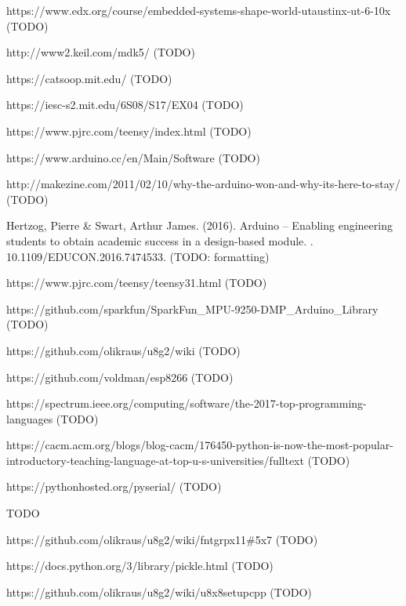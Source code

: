 \documentclass[12pt]{article}
\begin{document}
\newpage
\begin{thebibliography}{}
https://www.edx.org/course/embedded-systems-shape-world-utaustinx-ut-6-10x (TODO)

http://www2.keil.com/mdk5/ (TODO)

https://catsoop.mit.edu/ (TODO)

https://iesc-s2.mit.edu/6S08/S17/EX04 (TODO)

https://www.pjrc.com/teensy/index.html (TODO)

https://www.arduino.cc/en/Main/Software (TODO)

http://makezine.com/2011/02/10/why-the-arduino-won-and-why-its-here-to-stay/ (TODO)

Hertzog, Pierre \& Swart, Arthur James. (2016). Arduino -- Enabling engineering students to obtain academic success in a design-based module. . 10.1109/EDUCON.2016.7474533. (TODO: formatting)

https://www.pjrc.com/teensy/teensy31.html (TODO)

https://github.com/sparkfun/SparkFun\_MPU-9250-DMP\_Arduino\_Library (TODO)

https://github.com/olikraus/u8g2/wiki (TODO)

https://github.com/voldman/esp8266 (TODO)

https://spectrum.ieee.org/computing/software/the-2017-top-programming-languages (TODO)

https://cacm.acm.org/blogs/blog-cacm/176450-python-is-now-the-most-popular-introductory-teaching-language-at-top-u-s-universities/fulltext (TODO)

https://pythonhosted.org/pyserial/ (TODO)

TODO

https://github.com/olikraus/u8g2/wiki/fntgrpx11\#5x7 (TODO)

https://docs.python.org/3/library/pickle.html (TODO)

https://github.com/olikraus/u8g2/wiki/u8x8setupcpp (TODO)

\end{thebibliography}
\end{document}
